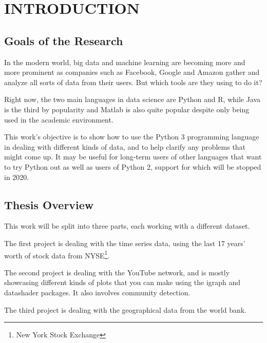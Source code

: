 \documentclass[12pt, a4paper]{article}
\begin{document}
\newpage
\section{INTRODUCTION}

\subsection{Goals of the Research}
In the modern world, big data and machine learning are becoming more and more prominent as companies such as Facebook, Google and Amazon gather and analyze all sorts of data from their users. But which tools are they using to do it?

Right now, the two main languages in data science are Python \cite{popularlanguages} and R, while Java is the third by popularity and Matlab is also quite popular despite only being used in the academic environment.

This work's objective is to show how to use the Python 3 programming language in dealing with different kinds of data, and to help clarify any problems that might come up. It may be useful for long-term users of other languages that want to try Python out as well as users of Python 2, support for which will be stopped in 2020.
\subsection{Thesis Overview}
This work will be split into three parts, each working with a different dataset.

The first project is dealing with the time series data, using the last 17 years' worth of stock data from NYSE\footnote{New York Stock Exchange}.

The second project is dealing with the YouTube network, and is mostly showcasing different kinds of plots that you can make using the igraph and datashader packages. It also involves community detection.

The third project is dealing with the geographical data from the world bank\cite{world_bank_source}.
\end{document}
